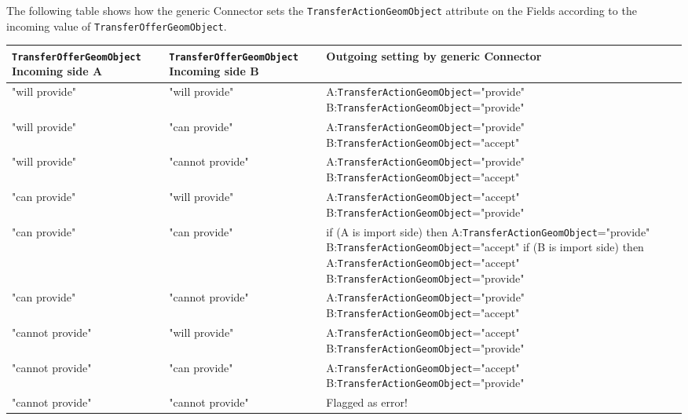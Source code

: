 The following table shows how the generic Connector sets the {\tt TransferActionGeomObject} attribute on the Fields according to the incoming value of {\tt TransferOfferGeomObject}.

\begin{tabular}[h]{|p{4.5cm}|p{4.5cm}|p{7cm}|}
     \hline\hline
     {\bf {\tt TransferOfferGeomObject} Incoming side A} & {\bf {\tt TransferOfferGeomObject} Incoming side B} & {\bf Outgoing setting by generic Connector}\\
     \hline\hline
     "will provide" & "will provide"    & A:{\tt TransferActionGeomObject}="provide" B:{\tt TransferActionGeomObject}="provide"\\ \hline
     "will provide" & "can provide"     & A:{\tt TransferActionGeomObject}="provide" B:{\tt TransferActionGeomObject}="accept"\\ \hline
     "will provide" & "cannot provide"  & A:{\tt TransferActionGeomObject}="provide" B:{\tt TransferActionGeomObject}="accept"\\ \hline
     "can provide"  & "will provide"    & A:{\tt TransferActionGeomObject}="accept"  B:{\tt TransferActionGeomObject}="provide"\\ \hline
     "can provide"  & "can provide"     & if (A is import side) then\newline
     A:{\tt TransferActionGeomObject}="provide" B:{\tt TransferActionGeomObject}="accept"
     if (B is import side) then\newline
     A:{\tt TransferActionGeomObject}="accept" B:{\tt TransferActionGeomObject}="provide"\\ \hline
     "can provide"  & "cannot provide"  & A:{\tt TransferActionGeomObject}="provide" B:{\tt TransferActionGeomObject}="accept"\\ \hline
     "cannot provide" & "will provide"  & A:{\tt TransferActionGeomObject}="accept"  B:{\tt TransferActionGeomObject}="provide"\\ \hline
     "cannot provide" & "can provide"   & A:{\tt TransferActionGeomObject}="accept"  B:{\tt TransferActionGeomObject}="provide"\\ \hline
     "cannot provide" & "cannot provide"& Flagged as error!\\ \hline
     \hline
\end{tabular}\newline
